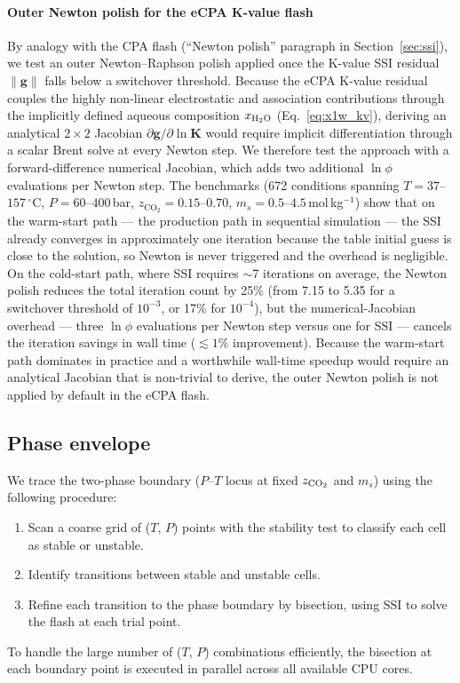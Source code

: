 \documentclass[preprint,12pt,number]{elsarticle}
\begin{document}
\paragraph{Outer Newton polish for the eCPA K-value flash}
By analogy with the CPA flash (``Newton polish'' paragraph in Section~\ref{sec:ssi}), we test an
outer Newton--Raphson polish applied once the K-value SSI residual
$\|\mathbf{g}\|$ falls below a switchover threshold.
Because the eCPA K-value residual couples the highly non-linear electrostatic
and association contributions through the implicitly defined aqueous composition
$x_{\rm H_2O}$ (Eq.~\eqref{eq:x1w_kv}), deriving an analytical $2\times 2$ Jacobian
$\partial\mathbf{g}/\partial\ln\mathbf{K}$ would require implicit differentiation
through a scalar Brent solve at every Newton step.
We therefore test the approach with a forward-difference numerical Jacobian,
which adds two additional $\ln \phi $ evaluations per Newton step.
The benchmarks (672 conditions spanning $T = 37$--$157\,^\circ$C, $P = 60$--$400\,$bar,
$z_{\text{CO}_2} = 0.15$--$0.70$, $m_s = 0.5$--$4.5\,$mol\,kg$^{-1}$) show
that on the warm-start path — the production path in sequential simulation —
the SSI already converges in approximately one iteration because the table
initial guess is close to the solution, so Newton is never triggered and the
overhead is negligible.
On the cold-start path, where SSI requires $\sim$7 iterations on average,
the Newton polish reduces the total iteration count by 25\% (from 7.15 to 5.35
for a switchover threshold of $10^{-3}$, or 17\% for $10^{-4}$), but the
numerical-Jacobian overhead — three $\ln \phi $ evaluations per Newton step versus one
for SSI — cancels the iteration savings in wall time ($\lesssim 1\%$
improvement).
Because the warm-start path dominates in practice and a worthwhile wall-time
speedup would require an analytical Jacobian that is non-trivial to derive,
the outer Newton polish is not applied by default in the eCPA flash.

\subsection{Phase envelope}
\label{sec:envelope}

We trace the two-phase boundary ($P$--$T$ locus at fixed $z_{\rm CO_2}$ and $m_s$) using the following
procedure:
\begin{enumerate}
  \item Scan a coarse grid of ($T$, $P$) points with the stability test to classify each
        cell as stable or unstable.
  \item Identify transitions between stable and unstable cells.
  \item Refine each transition to the phase boundary by bisection, using SSI
        to solve the flash at each trial point.
\end{enumerate}
To handle the large number of ($T$, $P$) combinations efficiently, the bisection at each
boundary point is executed in parallel across all available CPU cores.
\end{document}
